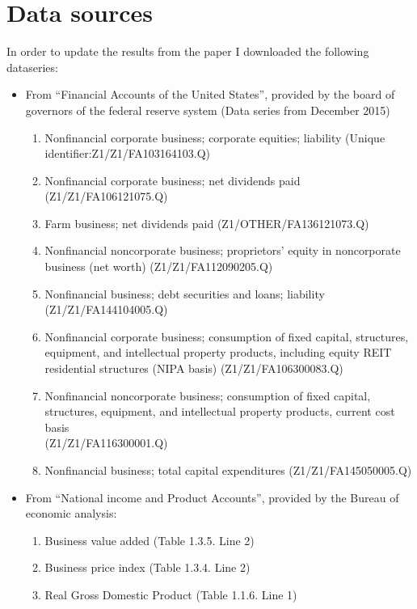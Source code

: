 \section{Data sources}
\label{sub:Data sources}

In order to update the results from the paper I downloaded the following
dataseries:
\begin{itemize}
\item From ``Financial Accounts of the United States'', provided by the board
  of governors of the federal reserve system (Data series from December 2015)
  \begin{enumerate}
  \item Nonfinancial corporate business; corporate equities; liability (Unique
    identifier:Z1/Z1/FA103164103.Q)
  \item Nonfinancial corporate business; net dividends paid
    (Z1/Z1/FA106121075.Q)
  \item Farm business; net dividends paid (Z1/OTHER/FA136121073.Q)
  \item Nonfinancial noncorporate business; proprietors' equity in noncorporate
    business (net worth) (Z1/Z1/FA112090205.Q)
  \item Nonfinancial business; debt securities and loans; liability\\
    (Z1/Z1/FA144104005.Q)
  \item Nonfinancial corporate business; consumption of fixed capital,
    structures, equipment, and intellectual property products, including equity
    REIT residential structures (NIPA basis) (Z1/Z1/FA106300083.Q)
  \item Nonfinancial noncorporate business; consumption of fixed capital,
    structures, equipment, and intellectual property products, current cost
    basis\\
    (Z1/Z1/FA116300001.Q)
  \item Nonfinancial business; total capital expenditures (Z1/Z1/FA145050005.Q)
  \end{enumerate}
\item From ``National income and Product Accounts'', provided by the Bureau of
  economic analysis:
  \begin{enumerate}
  \item Business value added (Table 1.3.5. Line 2)
  \item Business price index (Table 1.3.4. Line 2)
  \item Real Gross Domestic Product (Table 1.1.6. Line 1)
  \end{enumerate}

\end{itemize}
